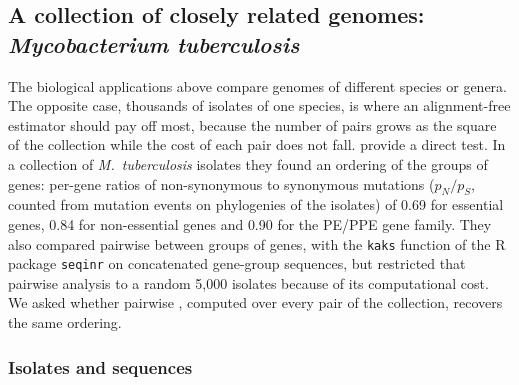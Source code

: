 %

\subsection*{A collection of closely related genomes: \textit{Mycobacterium tuberculosis}}

The biological applications above compare genomes of different species or genera. The opposite case,
thousands of isolates of one species, is where an alignment-free estimator should pay off most,
because the number of pairs grows as the square of the collection while the cost of each pair does
not fall. \citet{gan2025} provide a direct test. In a collection of \mtbRunsGan{}
\textit{M.\ tuberculosis} isolates they found an ordering of the groups of genes: per-gene ratios of
non-synonymous to synonymous mutations ($p_N/p_S$, counted from mutation events on phylogenies of
the isolates) of 0.69 for essential genes, 0.84 for non-essential genes and 0.90 for the PE/PPE gene
family. They also compared pairwise \dnds between groups of genes, with the \texttt{kaks} function of
the R package \texttt{seqinr} on concatenated gene-group sequences, but restricted that pairwise
analysis to a random 5,000 isolates because of its computational cost. We asked whether pairwise
\method, computed over every pair of the collection, recovers the same ordering.

\subsubsection*{Isolates and sequences}

